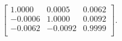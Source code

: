 \begin{equation*}
\begin{bmatrix}
  1.0000 &   0.0005 &   0.0062 \\
 -0.0006 &   1.0000 &   0.0092 \\
 -0.0062 &  -0.0092 &   0.9999 \\
\end{bmatrix}.
\end{equation*}
